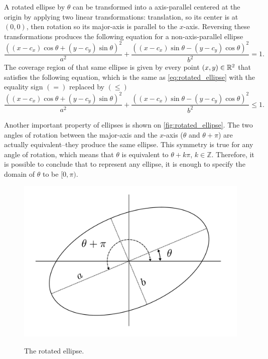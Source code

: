 A rotated ellipse by $\theta$ can be transformed into a axis-parallel centered at the origin by applying two linear transformations: translation, so its center is at $(0, 0)$, then rotation so its major-axis is parallel to the $x$-axis. Reversing these transformations produces the following equation for a non-axis-parallel ellipse
\begin{equation}\label{eq:rotated_ellipse}
\dfrac{((x-c_x)\cos\theta + (y-c_y)\sin\theta)^2}{a^2}+\dfrac{((x-c_x)\sin\theta - (y-c_y)\cos\theta)^2}{b^2}=1.
\end{equation}
The coverage region of that same ellipse is given by every point $(x, y)\in\mathbb{R}^2$ that satisfies the following equation, which is the same as \autoref{eq:rotated_ellipse} with the equality sign $(=)$ replaced by $(\le)$
\begin{equation}\label{eq:rotated_ellipse_co}
\dfrac{((x-c_x)\cos\theta + (y-c_y)\sin\theta)^2}{a^2}+\dfrac{((x-c_x)\sin\theta - (y-c_y)\cos\theta)^2}{b^2}\le 1.
\end{equation}

Another important property of ellipses is shown on \autoref{fig:rotated_ellipse}. The two angles of rotation between the major-axis and the $x$-axis ($\theta$ and $\theta+\pi$) are actually equivalent--they produce the same ellipse. This symmetry is true for any angle of rotation, which means that $\theta$ is equivalent to $\theta+k\pi$, $k\in\mathbb{Z}$. Therefore, it is possible to conclude that to represent any ellipse, it is enough to specify the domain of $\theta$ to be $[0, \pi)$.

\begin{figure}[H]
	\centering
	
	\caption{The rotated ellipse.}
	\includegraphics[scale=.38]{tex/figures/rotated_ellipse}
	\fautor
	\label{fig:rotated_ellipse}
\end{figure}


